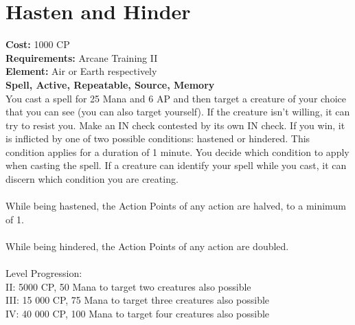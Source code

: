 \section{Hasten and Hinder}
\textbf{Cost:} 1000 CP\\
\textbf{Requirements:} Arcane Training II\\
\textbf{Element:} Air or Earth respectively\\
\textbf{Spell, Active, Repeatable, Source, Memory}\\
You cast a spell for 25 Mana and 6 AP and then target a creature of your choice that you can see (you can also target yourself). If the creature isn’t willing, it can try to resist you. Make an IN check contested by its own IN check. If you win, it is inflicted by one of two possible conditions: hastened or hindered. This condition applies for a duration of 1 minute. You decide which condition to apply when casting the spell. If a creature can identify your spell while you cast, it can discern which condition you are creating.\\
\\
While being hastened, the Action Points of any action are halved, to a minimum of 1.\\
\\
While being hindered, the Action Points of any action are doubled.\\
\\
Level Progression:\\
II: 5000 CP, 50 Mana to target two creatures also possible\\
III: 15 000 CP, 75 Mana to target three creatures also possible\\
IV: 40 000 CP, 100 Mana to target four creatures also possible \\